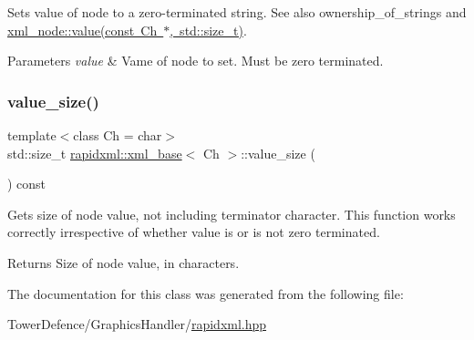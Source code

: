 Sets value of node to a zero-\/terminated string. See also ownership\+\_\+of\+\_\+strings and \mbox{\hyperlink{classrapidxml_1_1xml__base_a3b183c2db7022a6d30494dd2f0ac11e9}{xml\+\_\+node\+::value(const Ch $\ast$, std\+::size\+\_\+t)}}. 
\begin{DoxyParams}{Parameters}
{\em value} & Vame of node to set. Must be zero terminated. \\
\hline
\end{DoxyParams}
\mbox{\label{classrapidxml_1_1xml__base_a2eb123d471b1567fa4832b6ee2b75493}} 
\subsubsection{\texorpdfstring{value\+\_\+size()}{value\_size()}}
{\footnotesize\ttfamily template$<$class Ch  = char$>$ \\
std\+::size\+\_\+t \mbox{\hyperlink{classrapidxml_1_1xml__base}{rapidxml\+::xml\+\_\+base}}$<$ Ch $>$\+::value\+\_\+size (\begin{DoxyParamCaption}{ }\end{DoxyParamCaption}) const\hspace{0.3cm}{\ttfamily [inline]}}

Gets size of node value, not including terminator character. This function works correctly irrespective of whether value is or is not zero terminated. \begin{DoxyReturn}{Returns}
Size of node value, in characters. 
\end{DoxyReturn}


The documentation for this class was generated from the following file\+:\begin{DoxyCompactItemize}
\item 
Tower\+Defence/\+Graphics\+Handler/\mbox{\hyperlink{rapidxml_8hpp}{rapidxml.\+hpp}}\end{DoxyCompactItemize}
